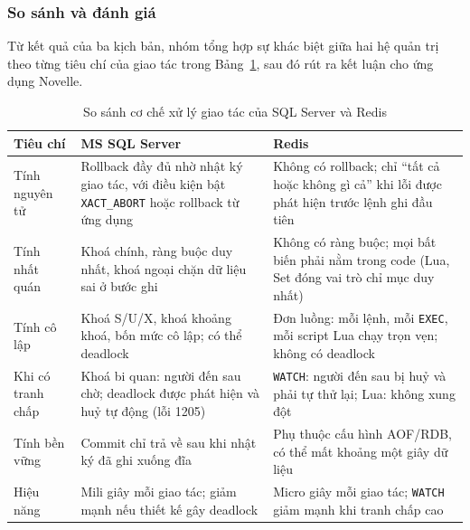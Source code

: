 \subsubsection{So sánh và đánh giá}
\label{subsubsec:tx-compare}

Từ kết quả của ba kịch bản, nhóm tổng hợp sự khác biệt giữa hai hệ quản trị theo từng tiêu chí của giao tác trong Bảng~\ref{tab:tx-compare}, sau đó rút ra kết luận cho ứng dụng Novelle.

\begin{table}[H]
\centering\small
\renewcommand{\arraystretch}{1.25}
\begin{tabularx}{\textwidth}{|>{\raggedright\arraybackslash}p{3.2cm}|>{\raggedright\arraybackslash}X|>{\raggedright\arraybackslash}X|}
\hline
\textbf{Tiêu chí} & \textbf{MS SQL Server} & \textbf{Redis} \\ \hline
Tính nguyên tử & Rollback đầy đủ nhờ nhật ký giao tác, với điều kiện bật \texttt{XACT\_ABORT} hoặc rollback từ ứng dụng & Không có rollback; chỉ ``tất cả hoặc không gì cả'' khi lỗi được phát hiện trước lệnh ghi đầu tiên \\ \hline
Tính nhất quán & Khoá chính, ràng buộc duy nhất, khoá ngoại chặn dữ liệu sai ở bước ghi & Không có ràng buộc; mọi bất biến phải nằm trong code (Lua, Set đóng vai trò chỉ mục duy nhất) \\ \hline
Tính cô lập & Khoá S/U/X, khoá khoảng khoá, bốn mức cô lập; có thể deadlock & Đơn luồng: mỗi lệnh, mỗi \texttt{EXEC}, mỗi script Lua chạy trọn vẹn; không có deadlock \\ \hline
Khi có tranh chấp & Khoá bi quan: người đến sau chờ; deadlock được phát hiện và huỷ tự động (lỗi 1205) & \texttt{WATCH}: người đến sau bị huỷ và phải tự thử lại; Lua: không xung đột \\ \hline
Tính bền vững & Commit chỉ trả về sau khi nhật ký đã ghi xuống đĩa & Phụ thuộc cấu hình AOF/RDB, có thể mất khoảng một giây dữ liệu \\ \hline
Hiệu năng & Mili giây mỗi giao tác; giảm mạnh nếu thiết kế gây deadlock & Micro giây mỗi giao tác; \texttt{WATCH} giảm mạnh khi tranh chấp cao \\ \hline
\end{tabularx}
\caption{So sánh cơ chế xử lý giao tác của SQL Server và Redis}
\label{tab:tx-compare}
\end{table}

